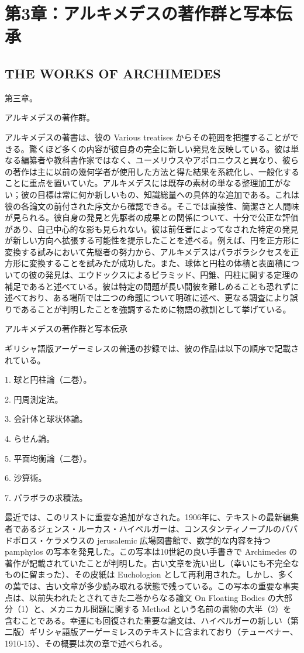 \documentclass[a4paper,11pt,openany]{ltjsbook}
\begin{document}
\clearpage

\chapter{第3章：アルキメデスの著作群と写本伝承}
\section*{THE WORKS OF ARCHIMEDES}

第三章。

アルキメデスの著作群。

アルキメデスの著書は、彼の Various treatises からその範囲を把握することができる。驚くほど多くの内容が彼自身の完全に新しい発見を反映している。彼は単なる編纂者や教科書作家ではなく、ユーメリウスやアポロニウスと異なり、彼らの著作は主に以前の幾何学者が使用した方法と得た結果を系統化し、一般化することに重点を置いていた。アルキメデスには既存の素材の単なる整理加工がない；彼の目標は常に何か新しいもの、知識総量への具体的な追加である。これは彼の各論文の前付された序文から確認できる。そこでは直接性、簡潔さと人間味が見られる。彼自身の発見と先駆者の成果との関係について、十分で公正な評価があり、自己中心的な影も見られない。彼は前任者によってなされた特定の発見が新しい方向へ拡張する可能性を提示したことを述べる。例えば、円を正方形に変換する試みにおいて先駆者の努力から、アルキメデスはパラボラシクセスを正方形に変換することを試みたが成功した。また、球体と円柱の体積と表面積についての彼の発見は、エウドックスによるピラミッド、円錐、円柱に関する定理の補足であると述べている。彼は特定の問題が長い間彼を難しめることも恐れずに述べており、ある場所では二つの命題について明確に述べ、更なる調査により誤りであることが判明したことを強調するために物語の教訓として挙げている。

アルキメデスの著作群と写本伝承

ギリシャ語版アーゲーミレスの普通の抄録では、彼の作品は以下の順序で記載されている。


1. 球と円柱論（二巻）。

2. 円周測定法。

3. 会計体と球状体論。

4. らせん論。

5. 平面均衡論（二巻）。

6. 沙算術。

7. パラボラの求積法。

最近では、このリストに重要な追加がなされた。1906年に、テキストの最新編集者であるジェンス・ルーカス・ハイベルガーは、コンスタンティノープルのパパドポロス・ケラメウスの jerusalemic 広場図書館で、数学的な内容を持つ pamphylos の写本を発見した。この写本は10世紀の良い手書きで Archimedes の著作が記載されていたことが判明した。古い文章を洗い出し（幸いにも不完全なものに留まった）、その皮紙は Euchologion として再利用された。しかし、多くの葉では、古い文章が多少読み取れる状態で残っている。この写本の重要な事実点は、以前失われたとされてきた二巻からなる論文 On Floating Bodies の大部分（1）と、メカニカル問題に関する Method という名前の書物の大半（2）を含むことである。幸運にも回復された重要な論文は、ハイベルガーの新しい（第二版）ギリシャ語版アーゲーミレスのテキストに含まれており（テューベナー、1910-15）、その概要は次の章で述べられる。
\end{document}
